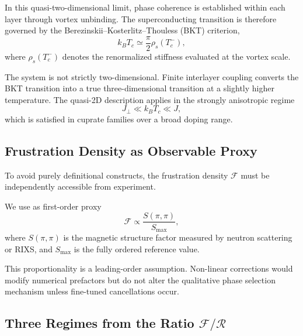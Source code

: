     In this quasi-two-dimensional limit,
    phase coherence is established within each layer
    through vortex unbinding.
    The superconducting transition
    is therefore governed by the
    Berezinskii--Kosterlitz--Thouless (BKT) criterion,
    \begin{equation}
      k_B T_c
      \simeq
      \frac{\pi}{2}
      \rho_s(T_c^-),
      \label{eq:BKT}
    \end{equation}
    where $\rho_s(T_c^-)$ denotes the renormalized stiffness
    evaluated at the vortex scale.

    The system is not strictly two-dimensional.
    Finite interlayer coupling
    converts the BKT transition
    into a true three-dimensional transition
    at a slightly higher temperature.
    The quasi-2D description applies
    in the strongly anisotropic regime
    \begin{equation}
      J_\perp
      \ll
      k_B T_c
      \ll
      J ,
    \end{equation}
    which is satisfied in cuprate families
    over a broad doping range.

  \subsection{Frustration Density as Observable Proxy}
    \label{subsec:frustration-observable}

    To avoid purely definitional constructs,
    the frustration density $\mathcal{F}$
    must be independently accessible from experiment.

    We use as first-order proxy
    \begin{equation}
      \mathcal{F}
      \propto
      \frac{S(\pi,\pi)}{S_{\max}},
      \label{eq:F-proxy}
    \end{equation}
    where $S(\pi,\pi)$ is the magnetic structure factor
    measured by neutron scattering or RIXS,
    and $S_{\max}$ is the fully ordered reference value.

    This proportionality is a leading-order assumption.
    Non-linear corrections would modify numerical prefactors
    but do not alter the qualitative phase selection mechanism
    unless fine-tuned cancellations occur.

  \subsection{Three Regimes from the Ratio \texorpdfstring{$\mathcal{F}/\mathcal{R}$}{F/R}}
    \label{subsec:F-over-R}


